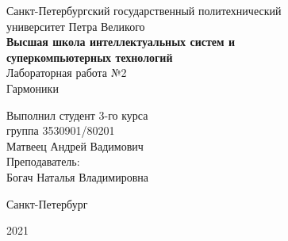 \documentclass[a4paper]{article}
\begin{document}
    \begin{center}
        \begin{center}
        \hfill \break
        \normalsize{Санкт-Петербургский государственный политехнический}\\
        \normalsize{университет Петра Великого}\\
        \hfill \break
        \normalsize{\textbf{Высшая школа интеллектуальных систем и}}\\ 
        \normalsize{\textbf{суперкомпьютерных технологий}}\\ 
        \hfill \break
        \hfill \break
        \hfill \break
        \normalsize{Лабораторная работа №2}\\
        \hfill \break
        \hfill \break
        \normalsize{\LARGE Гармоники}\\
        \end{center}
        \hfill \break
        \hfill \break
        \hfill \break
        \hfill \break
        \hfill \break
        \hfill \break
        \hfill \break
        \hfill \break
        \hfill \break
        \hfill \break
       \begin{flushright}
            \normalsize{Выполнил студент 3-го курса}\\
            \normalsize{группа 3530901/80201}\\
            \normalsize{Матвеец Андрей Вадимович}\\
            \hfill \break
            \normalsize{Преподаватель:}\\
            \normalsize{Богач Наталья Владимировна}\\
        \end{flushright}
        \hfill \break
        \hfill \break
        \hfill \break
        \hfill \break
        \begin{center} Санкт-Петербург\end{center}
        \begin{center}2021\end{center} 
        \thispagestyle{empty}
    \end{center}
    
    \newpage
        \tableofcontents
    
    \newpage
         \listoffigures
    
    \newpage
         \lstlistoflistings   
     
\end{document}
